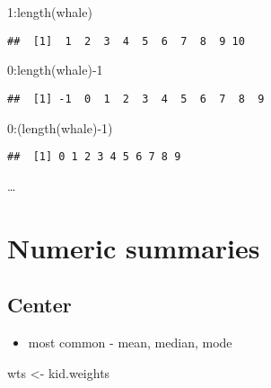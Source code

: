 \documentclass[
]{book}
\newenvironment{Shaded}{\begin{snugshade}}{\end{snugshade}}
\newcommand{\DecValTok}[1]{\textcolor[rgb]{0.00,0.00,0.81}{#1}}
\newcommand{\FunctionTok}[1]{\textcolor[rgb]{0.00,0.00,0.00}{#1}}
\newcommand{\NormalTok}[1]{#1}
\newcommand{\OtherTok}[1]{\textcolor[rgb]{0.56,0.35,0.01}{#1}}
\newcommand{\SpecialCharTok}[1]{\textcolor[rgb]{0.00,0.00,0.00}{#1}}
\providecommand{\tightlist}{%
  \setlength{\itemsep}{0pt}\setlength{\parskip}{0pt}}
\theoremstyle{definition}
\theoremstyle{definition}
\theoremstyle{definition}
\theoremstyle{definition}
\theoremstyle{remark}
\begin{document}
\begin{Shaded}
\begin{Highlighting}[]
\DecValTok{1}\SpecialCharTok{:}\FunctionTok{length}\NormalTok{(whale)}
\end{Highlighting}
\end{Shaded}

\begin{verbatim}
##  [1]  1  2  3  4  5  6  7  8  9 10
\end{verbatim}

\begin{Shaded}
\begin{Highlighting}[]
\DecValTok{0}\SpecialCharTok{:}\FunctionTok{length}\NormalTok{(whale)}\SpecialCharTok{{-}}\DecValTok{1}
\end{Highlighting}
\end{Shaded}

\begin{verbatim}
##  [1] -1  0  1  2  3  4  5  6  7  8  9
\end{verbatim}

\begin{Shaded}
\begin{Highlighting}[]
\DecValTok{0}\SpecialCharTok{:}\NormalTok{(}\FunctionTok{length}\NormalTok{(whale)}\SpecialCharTok{{-}}\DecValTok{1}\NormalTok{)}
\end{Highlighting}
\end{Shaded}

\begin{verbatim}
##  [1] 0 1 2 3 4 5 6 7 8 9
\end{verbatim}

\ldots{}

\hypertarget{numeric-summaries}{%
\section{Numeric summaries}\label{numeric-summaries}}

\hypertarget{center}{%
\subsection{Center}\label{center}}

\begin{itemize}
\tightlist
\item
  most common - mean, median, mode
\end{itemize}

\begin{Shaded}
\begin{Highlighting}[]
\NormalTok{wts }\OtherTok{\textless{}{-}}\NormalTok{ kid.weights}
\end{Highlighting}
\end{Shaded}
\end{document}
